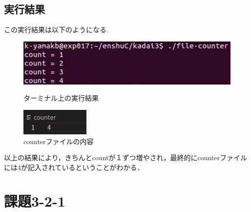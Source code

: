 \documentclass[dvipdfmx]{jarticle}
\begin{document}
\subsection{実行結果}
この実行結果は以下のようになる.
\begin{figure}[htbp]
    \begin{minipage}[b]{0.45\linewidth}
      \centering
      \includegraphics[keepaspectratio, scale=0.7]{result3-1.png}
      \caption{ターミナル上の実行結果}
    \end{minipage}
    \begin{minipage}[b]{0.45\linewidth}
      \centering
      \includegraphics[keepaspectratio, scale=0.8]{result3-1-1.png}
      \caption{counterファイルの内容}
    \end{minipage}
  \end{figure}
  以上の結果により，きちんとcountが１ずつ増やされ，最終的にcounterファイルには4が記入されているということがわかる．
\section{課題3-2-1}
\end{document}
